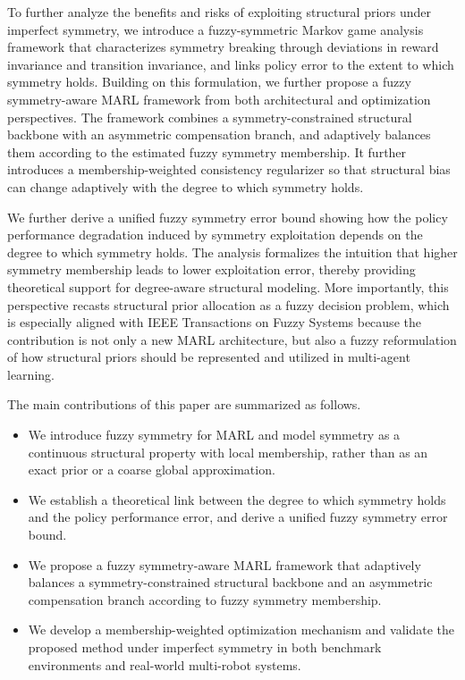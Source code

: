 \documentclass[lettersize,journal]{IEEEtran}
\begin{document}
To further analyze the benefits and risks of exploiting structural priors under imperfect symmetry, we introduce a fuzzy-symmetric Markov game analysis framework that characterizes symmetry breaking through deviations in reward invariance and transition invariance, and links policy error to the extent to which symmetry holds. Building on this formulation, we further propose a fuzzy symmetry-aware MARL framework from both architectural and optimization perspectives. The framework combines a symmetry-constrained structural backbone with an asymmetric compensation branch, and adaptively balances them according to the estimated fuzzy symmetry membership. It further introduces a membership-weighted consistency regularizer so that structural bias can change adaptively with the degree to which symmetry holds.

We further derive a unified fuzzy symmetry error bound showing how the policy performance degradation induced by symmetry exploitation depends on the degree to which symmetry holds. The analysis formalizes the intuition that higher symmetry membership leads to lower exploitation error, thereby providing theoretical support for degree-aware structural modeling. More importantly, this perspective recasts structural prior allocation as a fuzzy decision problem, which is especially aligned with IEEE Transactions on Fuzzy Systems because the contribution is not only a new MARL architecture, but also a fuzzy reformulation of how structural priors should be represented and utilized in multi-agent learning.

The main contributions of this paper are summarized as follows.
\begin{itemize}
\item We introduce fuzzy symmetry for MARL and model symmetry as a continuous structural property with local membership, rather than as an exact prior or a coarse global approximation.
\item We establish a theoretical link between the degree to which symmetry holds and the policy performance error, and derive a unified fuzzy symmetry error bound.
\item We propose a fuzzy symmetry-aware MARL framework that adaptively balances a symmetry-constrained structural backbone and an asymmetric compensation branch according to fuzzy symmetry membership.
\item We develop a membership-weighted optimization mechanism and validate the proposed method under imperfect symmetry in both benchmark environments and real-world multi-robot systems.
\end{itemize}
\end{document}
